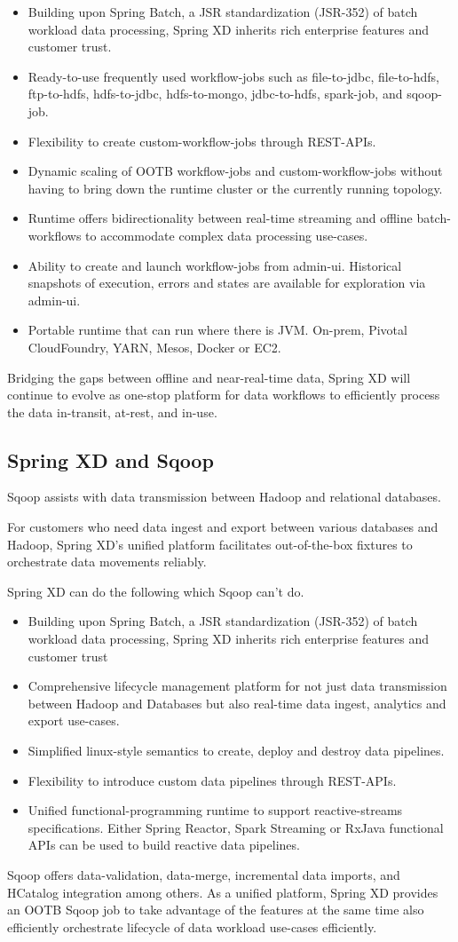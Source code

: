 \begin{itemize}
\item Building upon Spring Batch, a JSR standardization (JSR-352) of batch workload data processing, Spring XD inherits rich enterprise features and customer trust.
\item Ready-to-use frequently used workflow-jobs such as file-to-jdbc, file-to-hdfs, ftp-to-hdfs, hdfs-to-jdbc, hdfs-to-mongo, jdbc-to-hdfs, spark-job, and sqoop-job.
\item Flexibility to create custom-workflow-jobs through REST-APIs.
\item Dynamic scaling of OOTB workflow-jobs and custom-workflow-jobs without having to bring down the runtime cluster or the currently running topology.
\item Runtime offers bidirectionality between real-time streaming and offline batch-workflows to accommodate complex data processing use-cases.
\item Ability to create and launch workflow-jobs from admin-ui. Historical snapshots of execution, errors and states are available for exploration via admin-ui.
\item Portable runtime that can run where there is JVM. On-prem, Pivotal CloudFoundry, YARN, Mesos, Docker or EC2.
\end{itemize}

Bridging the gaps between offline and near-real-time data, Spring XD will continue to evolve as one-stop platform for data workflows to efficiently process the data in-transit, at-rest, and in-use.

\subsection{Spring XD and Sqoop}
Sqoop assists with data transmission between Hadoop and relational databases.

For customers who need data ingest and export between various databases and Hadoop, Spring XD’s unified platform facilitates out-of-the-box fixtures to orchestrate data movements reliably. 

Spring XD can do the following which Sqoop can't do.

\begin{itemize}
\item Building upon Spring Batch, a JSR standardization (JSR-352) of batch workload data processing, Spring XD inherits rich enterprise features and customer trust
\item Comprehensive lifecycle management platform for not just data transmission between Hadoop and Databases but also real-time data ingest, analytics and export use-cases.
\item Simplified linux-style semantics to create, deploy and destroy data pipelines.
\item Flexibility to introduce custom data pipelines through REST-APIs.
\item Unified functional-programming runtime to support reactive-streams specifications. Either Spring Reactor, Spark Streaming or RxJava functional APIs can be used to build reactive data pipelines.
\end{itemize}

Sqoop offers data-validation, data-merge, incremental data imports, and HCatalog integration among others. As a unified platform, Spring XD provides an OOTB Sqoop job to take advantage of the features at the same time also efficiently orchestrate lifecycle of data workload use-cases efficiently.
